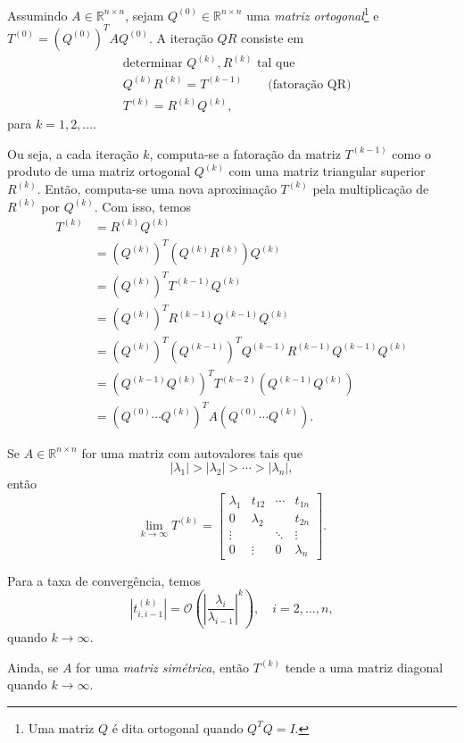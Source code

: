 Assumindo $A\in\mathbb{R}^{n\times n}$, sejam $Q^{(0)}\in\mathbb{R}^{n\times n}$ uma \emph{matriz ortogonal}\footnote{Uma matriz $Q$ é dita ortogonal quando $Q^TQ = I$.} e $T^{(0)} = (Q^{(0)})^TAQ^{(0)}$. A iteração $QR$ consiste em
\begin{align}
  &\text{determinar }Q^{(k)}, R^{(k)}\text{ tal que}\nonumber\\
  &Q^{(k)}R^{(k)} = T^{(k-1)}\qquad\text{(fatoração QR)}\\
  &T^{(k)} = R^{(k)}Q^{(k)},
\end{align}
para $k=1,2,\ldots$.

Ou seja, a cada iteração $k$, computa-se a fatoração da matriz $T^{(k-1)}$ como o produto de uma matriz ortogonal $Q^{(k)}$ com uma matriz triangular superior $R^{(k)}$. Então, computa-se uma nova aproximação $T^{(k)}$ pela multiplicação de $R^{(k)}$ por $Q^{(k)}$. Com isso, temos
\begin{align}
  T^{(k)} &= R^{(k)}Q^{(k)}\\
          &= (Q^{(k)})^T(Q^{(k)}R^{(k)})Q^{(k)}\\
          &= (Q^{(k)})^TT^{(k-1)}Q^{(k)}\\
          &= (Q^{(k)})^TR^{(k-1)}Q^{(k-1)}Q^{(k)}\\
          &= (Q^{(k)})^T(Q^{(k-1)})^TQ^{(k-1)}R^{(k-1)}Q^{(k-1)}Q^{(k)}\\
          &= (Q^{(k-1)}Q^{(k)})^TT^{(k-2)}(Q^{(k-1)}Q^{(k)})\\
          &=(Q^{(0)}\cdots Q^{(k)})^TA(Q^{(0)}\cdots Q^{(k)}).
\end{align}

\begin{obs}
  Se $A\in\mathbb{R}^{n\times n}$ for uma matriz com autovalores tais que
  \begin{equation}
    |\lambda_1| > |\lambda_2| > \cdots > |\lambda_n|,
  \end{equation}
  então
  \begin{equation}
    \lim_{k\to\infty} T^{(k)} =   \begin{bmatrix}
    \lambda_1 & t_{12} & \cdots & t_{1n}\\
    0 & \lambda_2 & & t_{2n}\\
    \vdots & & \ddots & \vdots\\
    0 & \vdots & 0 & \lambda_n
  \end{bmatrix}.
\end{equation}

  Para a taxa de convergência, temos
  \begin{equation}
    |t^{(k)}_{i,i-1}| = \mathcal{O}\left(\left|\frac{\lambda_i}{\lambda_{i-1}}\right|^k\right),\quad i=2,\dotsc,n,
  \end{equation}
  quando $k\to\infty$.

  Ainda, se $A$ for uma \emph{matriz simétrica}, então $T^{(k)}$ tende a uma matriz diagonal quando $k\to\infty$.
\end{obs}

